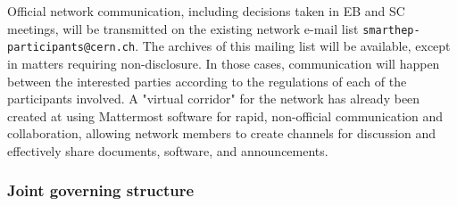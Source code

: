 Official network communication, including decisions taken in EB and SC meetings, will be transmitted on the
existing network e-mail list \texttt{smarthep-participants@cern.ch}. The archives of this mailing list will be available, except in matters requiring non-disclosure. 
In those cases, communication will happen between %
the interested parties according to the regulations of each of the participants involved. 
A "virtual corridor" for the network has already been created at \cern using Mattermost software for rapid, non-official communication and collaboration,
allowing network members to create channels for discussion and effectively share documents, software, and announcements.

%
\vspace{-2mm}
\subsubsection{Joint governing structure}%
\label{sub:jointGoverningStructure}

